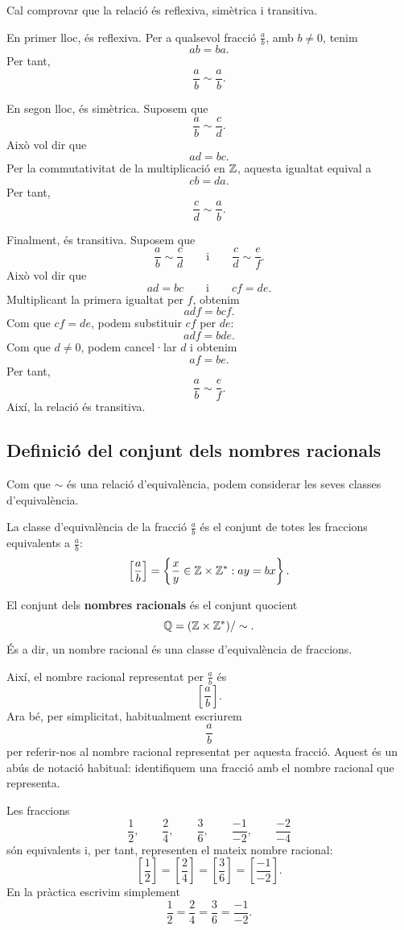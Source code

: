 \begin{prova}
	Cal comprovar que la relació és reflexiva, simètrica i transitiva.
	
	En primer lloc, és reflexiva. Per a qualsevol fracció \(\frac{a}{b}\), amb \(b\neq0\), tenim
	\[
	ab=ba.
	\]
	Per tant,
	\[
	\frac{a}{b}\sim\frac{a}{b}.
	\]
	
	En segon lloc, és simètrica. Suposem que
	\[
	\frac{a}{b}\sim\frac{c}{d}.
	\]
	Això vol dir que
	\[
	ad=bc.
	\]
	Per la commutativitat de la multiplicació en \(\mathbb{Z}\), aquesta igualtat equival a
	\[
	cb=da.
	\]
	Per tant,
	\[
	\frac{c}{d}\sim\frac{a}{b}.
	\]
	
	Finalment, és transitiva. Suposem que
	\[
	\frac{a}{b}\sim\frac{c}{d}
	\qquad\text{i}\qquad
	\frac{c}{d}\sim\frac{e}{f}.
	\]
	Això vol dir que
	\[
	ad=bc
	\qquad\text{i}\qquad
	cf=de.
	\]
	Multiplicant la primera igualtat per \(f\), obtenim
	\[
	adf=bcf.
	\]
	Com que \(cf=de\), podem substituir \(cf\) per \(de\):
	\[
	adf=bde.
	\]
	Com que \(d\neq0\), podem cancel·lar \(d\) i obtenim
	\[
	af=be.
	\]
	Per tant,
	\[
	\frac{a}{b}\sim\frac{e}{f}.
	\]
	Així, la relació és transitiva.
\end{prova}

\subsection{Definició del conjunt dels nombres racionals}

Com que \(\sim\) és una relació d'equivalència, podem considerar les seves classes d'equivalència.

La classe d'equivalència de la fracció \(\frac{a}{b}\) és el conjunt de totes les fraccions equivalents a \(\frac{a}{b}\):
\[
\left[\frac{a}{b}\right]
=
\left\{
\frac{x}{y}\in\mathbb{Z}\times\mathbb{Z}^{*}:
ay=bx
\right\}.
\]

\begin{definicio}
	El conjunt dels \textbf{nombres racionals} és el conjunt quocient
	\[
	\mathbb{Q}=(\mathbb{Z}\times\mathbb{Z}^{*})/\sim.
	\]
	És a dir, un nombre racional és una classe d'equivalència de fraccions.
\end{definicio}

Així, el nombre racional representat per \(\frac{a}{b}\) és
\[
\left[\frac{a}{b}\right].
\]
Ara bé, per simplicitat, habitualment escriurem
\[
\frac{a}{b}
\]
per referir-nos al nombre racional representat per aquesta fracció. Aquest és un abús de notació habitual: identifiquem una fracció amb el nombre racional que representa.

\begin{exemple}
	Les fraccions
	\[
	\frac{1}{2},
	\qquad
	\frac{2}{4},
	\qquad
	\frac{3}{6},
	\qquad
	\frac{-1}{-2},
	\qquad
	\frac{-2}{-4}
	\]
	són equivalents i, per tant, representen el mateix nombre racional:
	\[
	\left[\frac{1}{2}\right]
	=
	\left[\frac{2}{4}\right]
	=
	\left[\frac{3}{6}\right]
	=
	\left[\frac{-1}{-2}\right].
	\]
	En la pràctica escrivim simplement
	\[
	\frac{1}{2}
	=
	\frac{2}{4}
	=
	\frac{3}{6}
	=
	\frac{-1}{-2}.
	\]
\end{exemple}


